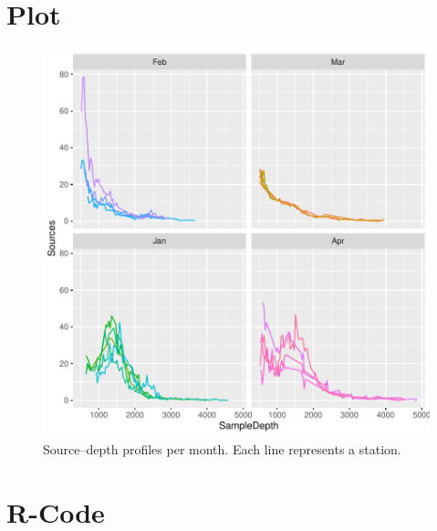 \documentclass[
  letterpaper,
  DIV=11,
  numbers=noendperiod]{scrartcl}
\begin{document}
\section{Plot}

\begin{figure}[H]

{\centering \includegraphics{day1_practical_2_files/figure-pdf/unnamed-chunk-37-1.pdf}

}

\caption{Source--depth proﬁles per month. Each line represents a
station.}

\end{figure}%

\section{R-Code}
\end{document}

